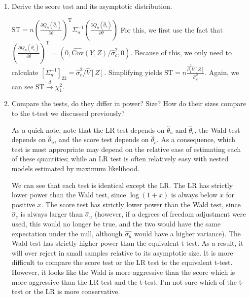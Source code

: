 \documentclass[12pt,english]{article}
\newcommand{\T}{\ensuremath{\text{T}}}
\begin{document}
\begin{enumerate}
\begin{enumerate}
		\vspace{1em}
		\item Derive the score test and its asymptotic distribution.
		\vspace{1em}
		
		$\text{ST} = n (\frac{\partial Q_{n}(\hat{\theta}_{c})}{\partial \theta})^{\T} \Sigma_{n}^{-1} (\frac{\partial Q_{n}(\hat{\theta}_{c})}{\partial \theta})$
		For this, we first use the fact that $(\frac{\partial Q_{n}(\hat{\theta}_{c})}{\partial \theta})^{\T} = (0, \hat{\text{Cov}}(Y, Z)/\hat{\sigma}^{2}_{c}, 0)$. Because of this, we only need to calculate $\left[ \Sigma_{n}^{-1} \right]_{22} = \hat{\sigma}_{c}^{2} / \hat{V}[Z]$. Simplifying yields $\text{ST} = n \frac{\hat{\beta}_{1}^{2}\hat{V}[Z]}{\hat{\sigma}^{2}_{c}}$. Again, we can see $\text{ST} \overset{d}{\to} \chi^{2}_{1}$.
		
		\vspace{1em}
		\item Compare the tests, do they differ in power? Size? How do their sizes compare to the t-test we discussed previously?
		\vspace{1em}
		
		As a quick note, note that the LR test depends on $\hat{\theta}_{u}$ and $\hat{\theta}_{c}$, the Wald test depends on $\hat{\theta}_{u}$, and the score test depends on $\hat{\theta}_{c}$. As a consequence, which test is most appropriate may depend on the relative ease of estimating each of these quantities; while an LR test is often relatively easy with nested models estimated by maximum likelihood.
		
		We can see that each test is identical except the LR. The LR has strictly lower power than the Wald test, since $\log(1 + x)$ is always below $x$ for positive $x$. The score test has strictly lower power than the Wald test, since $\hat{\sigma}_{c}$ is always larger than $\hat{\sigma}_{u}$ (however, if a degrees of freedom adjustment were used, this would no longer be true, and the two would have the same expectation under the null, although $\hat{\sigma_{u}}$ would have a higher variance). The Wald test has strictly higher power than the equivalent t-test. As a result, it will over reject in small samples relative to its asymptotic size. It is more difficult to compare the score test or the LR test to the equivalent t-test. However, it looks like the Wald is more aggressive than the score which is more aggressive than the LR test and the t-test. I'm not sure which of the t-test or the LR is more conservative.
		
	\end{enumerate}
\end{enumerate}
\end{document}

